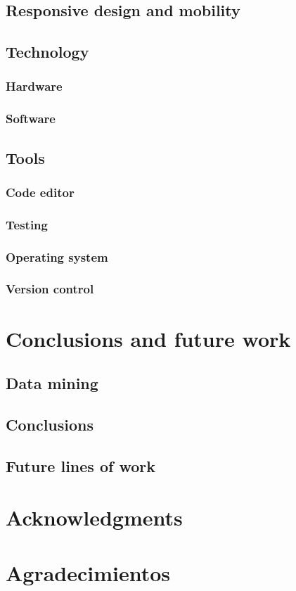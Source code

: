 \documentclass{DeustoFDP}
\begin{document}
\section{Responsive design and mobility}
\section{Technology}
\subsection{Hardware}
\subsection{Software}
\section{Tools}
\subsection{Code editor}
\subsection{Testing}
\subsection{Operating system}
\subsection{Version control}

\chapter{Conclusions and future work}
\section{Data mining}
\section{Conclusions}
\section{Future lines of work}

\chapter{Acknowledgments}

\chapter{Agradecimientos}

\printbibliography[heading=bibintoc]

\appendix

\backmatter
\end{document}
